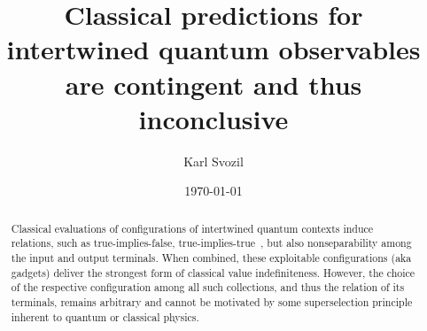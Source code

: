 \documentclass[%
  reprint,
  twocolumn,
 showpacs,
 showkeys,
 preprintnumbers,
 amsmath,amssymb,
 aps,
  prl,
  longbibliography,
 ]{revtex4-1}
\begin{document}
\title{Classical predictions for intertwined quantum observables are contingent and thus inconclusive}


\author{Karl Svozil}




\date{\today}

\begin{abstract}
Classical evaluations of configurations of intertwined quantum contexts induce relations, such as true-implies-false, true-implies-true~\cite{2018-minimalYIYS}, but also nonseparability among the input and output terminals. When combined, these exploitable configurations (aka gadgets) deliver the strongest form of classical value indefiniteness. However, the choice of the respective configuration among all such collections, and thus the relation of its terminals, remains arbitrary and cannot be motivated by some superselection principle inherent to quantum or classical physics.
\end{abstract}


\maketitle
\end{document}
